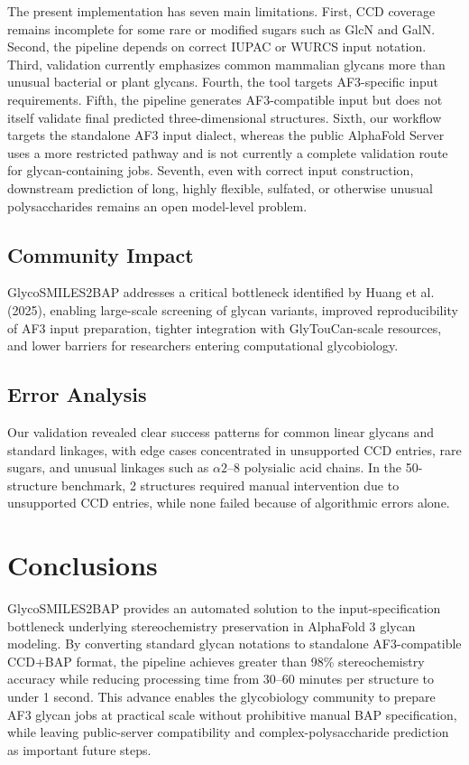 \documentclass[11pt,a4paper]{article}
\begin{document}
The present implementation has seven main limitations. First, CCD coverage remains incomplete for some rare or modified sugars such as GlcN and GalN. Second, the pipeline depends on correct IUPAC or WURCS input notation. Third, validation currently emphasizes common mammalian glycans more than unusual bacterial or plant glycans. Fourth, the tool targets AF3-specific input requirements. Fifth, the pipeline generates AF3-compatible input but does not itself validate final predicted three-dimensional structures. Sixth, our workflow targets the standalone AF3 input dialect, whereas the public AlphaFold Server uses a more restricted pathway and is not currently a complete validation route for glycan-containing jobs. Seventh, even with correct input construction, downstream prediction of long, highly flexible, sulfated, or otherwise unusual polysaccharides remains an open model-level problem.

\subsection{Community Impact}

GlycoSMILES2BAP addresses a critical bottleneck identified by Huang et al. (2025), enabling large-scale screening of glycan variants, improved reproducibility of AF3 input preparation, tighter integration with GlyTouCan-scale resources, and lower barriers for researchers entering computational glycobiology.

\subsection{Error Analysis}

Our validation revealed clear success patterns for common linear glycans and standard linkages, with edge cases concentrated in unsupported CCD entries, rare sugars, and unusual linkages such as $\alpha2$--8 polysialic acid chains. In the 50-structure benchmark, 2 structures required manual intervention due to unsupported CCD entries, while none failed because of algorithmic errors alone.

\section{Conclusions}

GlycoSMILES2BAP provides an automated solution to the input-specification bottleneck underlying stereochemistry preservation in AlphaFold 3 glycan modeling. By converting standard glycan notations to standalone AF3-compatible CCD+BAP format, the pipeline achieves greater than 98\% stereochemistry accuracy while reducing processing time from 30--60 minutes per structure to under 1 second. This advance enables the glycobiology community to prepare AF3 glycan jobs at practical scale without prohibitive manual BAP specification, while leaving public-server compatibility and complex-polysaccharide prediction as important future steps.
\end{document}
